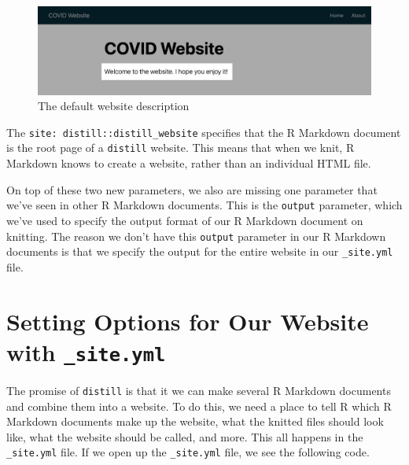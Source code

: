 \documentclass[
]{book}
\begin{document}
\begin{figure}
\includegraphics[width=1\linewidth]{assets/website-description} \caption{The default website description}\label{fig:website-description}
\end{figure}

The \texttt{site:\ distill::distill\_website} specifies that the R Markdown document is the root page of a \texttt{distill} website. This means that when we knit, R Markdown knows to create a website, rather than an individual HTML file.

On top of these two new parameters, we also are missing one parameter that we've seen in other R Markdown documents. This is the \texttt{output} parameter, which we've used to specify the output format of our R Markdown document on knitting. The reason we don't have this \texttt{output} parameter in our R Markdown documents is that we specify the output for the entire website in our \texttt{\_site.yml} file.

\hypertarget{setting-options-for-our-website-with-_site.yml}{%
\section*{\texorpdfstring{Setting Options for Our Website with \texttt{\_site.yml}}{Setting Options for Our Website with \_site.yml}}\label{setting-options-for-our-website-with-_site.yml}}

The promise of \texttt{distill} is that it we can make several R Markdown documents and combine them into a website. To do this, we need a place to tell R which R Markdown documents make up the website, what the knitted files should look like, what the website should be called, and more. This all happens in the \texttt{\_site.yml} file. If we open up the \texttt{\_site.yml} file, we see the following code.
\end{document}
